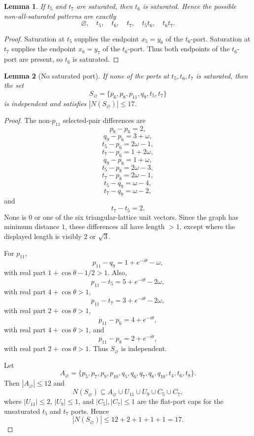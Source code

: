 \documentclass[11pt]{article}
\theoremstyle{plain}
\newtheorem{lemma}{Lemma}
\numberwithin{equation}{section}
\begin{document}
\begin{lemma}\label{lem:flat-patterns}
If $t_5$ and $t_7$ are saturated, then $t_6$ is saturated. Hence the possible non-all-saturated patterns are exactly
\[
\varnothing,
 \quad t_5,
 \quad t_6,
 \quad t_7,
 \quad t_5t_6,
 \quad t_6t_7.
\]
\end{lemma}

\begin{proof}
Saturation at $t_5$ supplies the endpoint $x_5=y_6$ of the $t_6$-port. Saturation at $t_7$ supplies the endpoint $x_6=y_7$ of the $t_6$-port. Thus both endpoints of the $t_6$-port are present, so $t_6$ is saturated.
\end{proof}

\begin{lemma}[No saturated port]\label{lem:row0}
If none of the ports at $t_5,t_6,t_7$ is saturated, then the set
\[
 S_{\varnothing}=\{p_6,p_8,p_{11},q_9,t_5,t_7\}
\]
is independent and satisfies $|N(S_{\varnothing})|\le17$.
\end{lemma}

\begin{proof}
The non-$p_{11}$ selected-pair differences are
\[
 p_8-p_6=2,
\]
\[
 q_9-p_6=3+\omega,
\]
\[
 t_5-p_6=2\omega-1,
\]
\[
 t_7-p_6=1+2\omega,
\]
\[
 q_9-p_8=1+\omega,
\]
\[
 t_5-p_8=2\omega-3,
\]
\[
 t_7-p_8=2\omega-1,
\]
\[
 t_5-q_9=\omega-4,
\]
\[
 t_7-q_9=\omega-2,
\]
and
\[
 t_7-t_5=2.
\]
None is $0$ or one of the six triangular-lattice unit vectors. Since the graph has minimum distance $1$, these differences all have length $>1$, except where the displayed length is visibly $2$ or $\sqrt3$.

For $p_{11}$,
\[
 p_{11}-q_9=1+e^{-i\theta}-\omega,
\]
with real part $1+\cos\theta-1/2>1$.
Also,
\[
 p_{11}-t_5=5+e^{-i\theta}-2\omega,
\]
with real part $4+\cos\theta>1$,
\[
 p_{11}-t_7=3+e^{-i\theta}-2\omega,
\]
with real part $2+\cos\theta>1$,
\[
 p_{11}-p_6=4+e^{-i\theta},
\]
with real part $4+\cos\theta>1$, and
\[
 p_{11}-p_8=2+e^{-i\theta},
\]
with real part $2+\cos\theta>1$. Thus $S_{\varnothing}$ is independent.

Let
\[
A_{\varnothing}=\{p_5,p_7,p_9,p_{10},q_5,q_6,q_7,q_8,q_{10},t_4,t_6,t_8\}.
\]
Then $|A_{\varnothing}|\le12$ and
\[
 N(S_{\varnothing})\subseteq A_{\varnothing}\cup U_{11}\cup U_9\cup C_5\cup C_7,
\]
where $|U_{11}|\le2$, $|U_9|\le1$, and $|C_5|,|C_7|\le1$ are the flat-port caps for the unsaturated $t_5$ and $t_7$ ports. Hence
\[
 |N(S_{\varnothing})|\le12+2+1+1+1=17.
\]
\end{proof}
\end{document}

